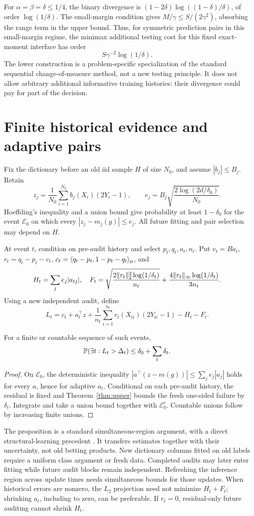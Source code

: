 For $\alpha=\beta=\delta\le1/4$, the binary divergence is
$(1-2\delta)\log((1-\delta)/\delta)$, of order $\log(1/\delta)$. The small-margin condition gives $M/\gamma\le S/(2\gamma^2)$, absorbing the range term in the upper bound. Thus, for symmetric prediction pairs in this small-margin regime, the minimax additional testing cost for this fixed exact-moment interface has order
\[
 S\gamma^{-2}\log(1/\delta).
\]
The lower construction is a problem-specific specialization of the standard sequential change-of-measure method, not a new testing principle. It does not allow arbitrary additional informative training histories: their divergence could pay for part of the decision.

\section{Finite historical evidence and adaptive pairs}
Fix the dictionary before an old iid sample $H$ of size $N_0$, and assume $|b_j|\le B_j$. Retain
\[
 z_j=\frac1{N_0}\sum_{i=1}^{N_0}b_j(X_i)(2Y_i-1),\qquad
 e_j=B_j\sqrt{\frac{2\log(2d/\delta_0)}{N_0}}.
\]
Hoeffding's inequality and a union bound give probability at least $1-\delta_0$ for the event $\mathcal E_0$ on which every $|z_j-m_j(g)|\le e_j$. All future fitting and pair selection may depend on $H$.

At event $t$, condition on pre-audit history and select $p_t,q_t,a_t,n_t$. Put $v_t=Ba_t$, $r_t=q_t-p_t-v_t$, $c_t=\langle q_t-p_t,1-p_t-q_t\rangle_\mu$, and
\[
 H_t=\sum_j e_j|a_{tj}|,\quad
 F_t=\sqrt{\frac{2\lVert r_t\rVert_2^2\log(1/\delta_t)}{n_t}}
       +\frac{4\lVert r_t\rVert_\infty\log(1/\delta_t)}{3n_t}.
\]
Using a new independent audit, define
\[
 L_t=c_t+a_t^\top z+\frac1{n_t}\sum_{i=1}^{n_t}
       r_t(X_{ti})(2Y_{ti}-1)-H_t-F_t.
\]
\begin{proposition}
For a finite or countable sequence of such events,
\[
 \mathbb P(\exists t:L_t>\Delta_t)\le\delta_0+\sum_t\delta_t.
\]
\end{proposition}
\begin{proof}
On $\mathcal E_0$, the deterministic inequality
$|a^\top(z-m(g))|\le\sum_j e_j|a_j|$ holds for every $a$, hence for adaptive $a_t$. Conditional on each pre-audit history, the residual is fixed and Theorem~\ref{thm:upper} bounds the fresh one-sided failure by $\delta_t$. Integrate and take a union bound together with $\mathcal E_0^c$. Countable unions follow by increasing finite unions.
\end{proof}

The proposition is a standard simultaneous-region argument, with a direct structural-learning precedent \cite[Lemma~A.13]{amoukou2026}. It transfers estimates together with their uncertainty, not old betting products. New dictionary columns fitted on old labels require a uniform class argument or fresh data. Completed audits may later enter fitting while future audit blocks remain independent. Refreshing the inference region across update times needs simultaneous bounds for those updates. When historical errors are nonzero, the $L_2$ projection need not minimize $H_t+F_t$; shrinking $a_t$, including to zero, can be preferable. If $r_t=0$, residual-only future auditing cannot shrink $H_t$.

